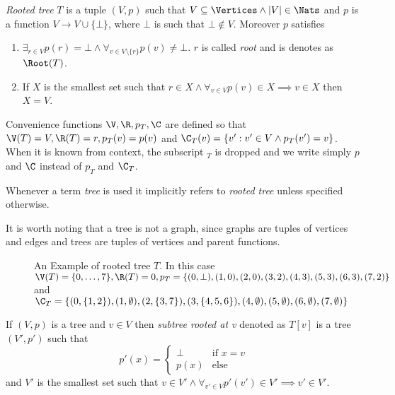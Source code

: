 \begin{defi}
    \emph{Rooted tree} $T$ is a tuple $(V, p)$ such that $V \subseteq \Vertices \land |V| \in \Nats$ and $p$ is a function $V \to V \cup \{\bot\}$, where $\bot$ is such that $\bot \not\in V$. Moreover $p$ satisfies
    \begin{enumerate}
        \item $\exists_{r \in V} p(r) = \bot \land \forall_{v \in V\setminus\{r\}} p(v) \neq \bot$. $r$ is called \emph{root} and is denotes as $\Root(T)$.
        \item If $X$ is the smallest set such that $r \in X \land \forall_{v \in V} p(v) \in X \implies v \in X$ then $X = V$.
    \end{enumerate}
    Convenience functions $\V, \R, p_T, \C$ are defined so that $\V(T) = V, \R(T) = r, p_T(v) = p(v)$ and $\C_T(v) = \{v' : v' \in V \land p_T(v') = v\}$. When it is known from context, the subscript $_T$ is dropped and we write simply $p$ and $\C$ instead of $p_T$ and $\C_T$.

    Whenever a term \emph{tree} is used it implicitly refers to \emph{rooted tree} unless specified otherwise.

    It is worth noting that a tree is not a graph, since graphs are tuples of vertices and edges and trees are tuples of vertices and parent functions.

    \begin{figure}[h]
        \centering
        \caption{An Example of rooted tree $T$. In this case $\V(T) = \{0,\ldots,7\}, \R(T) = 0, p_T = \{(0, \bot), (1,0), (2,0), (3,2), (4,3), (5,3), (6,3), (7,2)\}$ and $\C_T = \{(0,\{1,2\}), (1,\emptyset), (2,\{3,7\}), (3,\{4,5,6\}), (4, \emptyset), (5, \emptyset), (6, \emptyset), (7, \emptyset)\}$}
    \end{figure}
\end{defi}

\begin{defi}
    If $(V,p)$ is a tree and $v \in V$ then \emph{subtree rooted at v} denoted as $T[v]$ is a tree $(V', p')$ such that
    \[
        p'(x) = \begin{cases}
            \bot & \text{if } x = v \\
            p(x) & \text{else}
        \end{cases}
    \]
    and $V'$ is the smallest set such that $v \in V' \land \forall_{v' \in V} p'(v') \in V' \implies v' \in V'$.
\end{defi}

